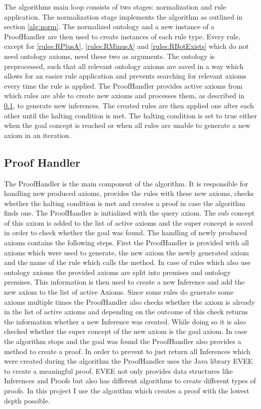 \documentclass[titlepage]{article}
\begin{document}
The algorithms main loop consists of two stages: normalization and rule application.
The normalization stage implements the algorithm as outlined in section \ref{alg:norm}. The normalized
ontology and a new instance of a ProofHandler are then used to create instances of each rule type. 
Every rule, except for \ref{rules:RPlusA}, \ref{rules:RMinusA} and \ref{rules:RBotExists}   which do not need ontology axioms, need these two as 
arguments. The ontology is preprocessed, such that all relevant ontology axioms are saved in a way which 
allows for an easier rule application and prevents searching for relevant axioms every time the rule is 
applied. The ProofHandler provides active axioms from which rules are able to create new axioms and processes
them, as described in \ref{alg:proofHandler}, to generate new inferences. The created rules are then applied 
one after each other until the halting condition is met.  The halting condition is set to true either when 
the goal concept is reached or when all rules are unable to generate a new axiom in an iteration. 


\subsection{Proof Handler}\label{alg:proofHandler}
The ProofHandler is the main component of the algorithm. It is responsible for handling new produced axioms,
provides the rules with these new axioms, checks whether the halting condition is met and creates a proof
in case the algorithm finds one. The ProofHandler is initialized with the query axiom. The sub concept of this
axiom is added to the list of active axioms and the super concept is saved in order to check whether the goal
was found. The handling of newly produced axioms contains the following steps. First the ProofHandler is provided
with all axioms which were used to generate, the new axiom the newly generated axiom and the name of the rule which 
calls the method. In case of rules which also use ontology axioms
the provided axioms are split into premises and ontology premises. This information is then used to create a new
Inference and add the new axiom to the list of active Axioms. Since some rules do generate some axioms multiple
times the ProofHandler also checks whether the axiom is already in the list of active axioms and depending on
the outcome of this check returns the information whether a new Inference was created. While doing so it is also
checked whether the super concept of the new axiom is the goal axiom. In case the algorithm stops
and the goal was found the ProofHandler also provides a method to create a proof. In order to prevent to just
return all Inferences which were created during the algorithm the ProofHandler uses the Java library EVEE to create
a meaningful proof.
EVEE not only provides data structures like Inferences and Proofs but also has different algorithms to create
different types of proofs. In this project I use the algorithm which creates a proof with the lowest depth possible.
\end{document}
